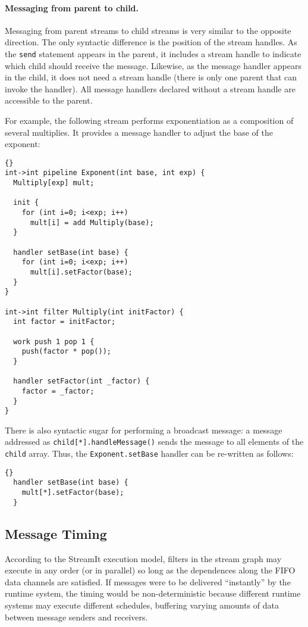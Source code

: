 \paragraph{Messaging from parent to child.}  Messaging from parent 
streams to child streams is very similar to the opposite direction.
The only syntactic difference is the position of the stream handles.
As the \lstinline|send| statement appears in the parent, it includes a
stream handle to indicate which child should receive the message.
Likewise, as the message handler appears in the child, it does not
need a stream handle (there is only one parent that can invoke the
handler).  All message handlers declared without a stream handle are
accessible to the parent.

For example, the following stream performs exponentiation as a
composition of several multiplies.  It provides a message handler to
adjust the base of the exponent:

\begin{lstlisting}{}
int->int pipeline Exponent(int base, int exp) {
  Multiply[exp] mult;

  init {
    for (int i=0; i<exp; i++)
      mult[i] = add Multiply(base);
  }

  handler setBase(int base) {
    for (int i=0; i<exp; i++)
      mult[i].setFactor(base);
  }
}

int->int filter Multiply(int initFactor) {
  int factor = initFactor;

  work push 1 pop 1 {
    push(factor * pop());
  }

  handler setFactor(int _factor) {
    factor = _factor;
  }
}
\end{lstlisting}{}

There is also syntactic sugar for performing a broadcast message: a
message addressed as \lstinline|child[*].handleMessage()| sends the
message to all elements of the \lstinline|child| array.  Thus, the
\lstinline|Exponent.setBase| handler can be re-written as follows:

\begin{lstlisting}{}
  handler setBase(int base) {
    mult[*].setFactor(base);
  }
\end{lstlisting}{}

\subsection{Message Timing}
\label{sec:message-timing}

According to the StreamIt execution model, filters in the stream graph
may execute in any order (or in parallel) so long as the dependences
along the FIFO data channels are satisfied.  If messages were to be
delivered ``instantly'' by the runtime system, the timing would be
non-deterministic because different runtime systems may execute
different schedules, buffering varying amounts of data between message
senders and receivers.  


